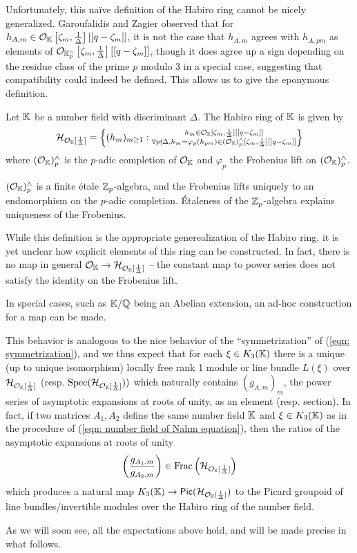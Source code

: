 Unfortunately, this na\"{i}ve definition of the Habiro ring cannot be nicely generalized. Garoufalidis and Zagier observed that for $h_{A,m}\in\mathcal{O}_{\mathbb{K}}\left[\zeta_{m},\frac{1}{\Delta}\right][[q-\zeta_{m}]]$, it is not the case that $h_{A,m}$ agrees with $h_{A,pm}$ as elements of $\mathcal{O}_{\mathbb{K}_{p}^{\wedge}}\left[\zeta_{m},\frac{1}{\Delta}\right][[q-\zeta_{m}]]$, though it does agree up a sign depending on the residue class of the prime $p$ modulo 3 in a special case, suggesting that compatibility could indeed be defined. This allows us to give the eponymous definition. 
\begin{definition}\label{def: Habiro ring of a number field}
    Let $\mathbb{K}$ be a number field with discriminant $\Delta$. The Habiro ring of $\mathbb{K}$ is given by 
    $$\mathcal{H}_{\mathcal{O}_{\mathbb{K}}[\frac{1}{\Delta}]}=\left\{(h_{m})_{m\geq1}:\substack{h_{m}\in\mathcal{O}_{\mathbb{K}}[\zeta_{m},\frac{1}{\Delta}][[q-\zeta_{m}]] \\
    \forall p\nmid\Delta, h_{m}=\varphi_{p}(h_{pm})\in(\mathcal{O}_{\mathbb{K}})_{p}^{\wedge}[\zeta_{m},\frac{1}{\Delta}][[q-\zeta_{m}]]}\right\}$$
    where $(\mathcal{O}_{\mathbb{K}})_{p}^{\wedge}$ is the $p$-adic completion of $\mathcal{O}_{\mathbb{K}}$ and $\varphi_{p}$ the Frobenius lift on $(\mathcal{O}_{\mathbb{K}})_{p}^{\wedge}$. 
\end{definition}
\begin{remark}
    $(\mathcal{O}_{\mathbb{K}})_{p}^{\wedge}$ is a finite \'{e}tale $\mathbb{Z}_{p}$-algebra, and the Frobenius lifts uniquely to an endomorphism on the $p$-adic completion. \'{E}taleness of the $\mathbb{Z}_{p}$-algebra explains uniqueness of the Frobenius.  
\end{remark}
While this definition is the appropriate generealization of the Habiro ring, it is yet unclear how explicit elements of this ring can be constructed. In fact, there is no map in general $\mathcal{O}_{\mathbb{K}}\to\mathcal{H}_{\mathcal{O}_{\mathbb{K}}[\frac{1}{\Delta}]}$ -- the constant map to power series does not satisfy the identity on the Frobenius lift. 
\begin{remark}
    In special cases, such as $\mathbb{K}/\mathbb{Q}$ being an Abelian extension, an ad-hoc construction for a map can be made. 
\end{remark}
This behavior is analogous to the nice behavior of the ``symmetrization'' of (\ref{eqn: symmetrization}), and we thus expect that for each $\xi\in K_{3}(\mathbb{K})$ there is a unique (up to unique isomorphism) locally free rank 1 module or line bundle $L(\xi)$ over $\mathcal{H}_{\mathcal{O}_{\mathbb{K}}[\frac{1}{\Delta}]}$ (resp. $\operatorname{Spec}(\mathcal{H}_{\mathcal{O}_{\mathbb{K}}[\frac{1}{\Delta}]}))$ which naturally contains $(g_{A,m})_{m}$, the power series of asymptotic expansions at roots of unity, as an element (resp. section). In fact, if two matrices $A_{1},A_{2}$ define the same number field $\mathbb{K}$ and $\xi\in K_{3}(\mathbb{K})$ as in the procedure of (\ref{eqn: number field of Nahm equation}), then the ratios of the asymptotic expansions at roots of unity
$$\left(\frac{g_{A_{1},m}}{g_{A_{2},m}}\right)\in\mathrm{Frac}\left(\mathcal{H}_{\mathcal{O}_{\mathbb{K}}[\frac{1}{\Delta}]}\right)$$
which produces a natural map $K_{3}(\mathbb{K})\to\mathsf{Pic}(\mathcal{H}_{\mathcal{O}_{\mathbb{K}}[\frac{1}{\Delta}]})$ to the Picard groupoid of line bundles/invertible modules over the Habiro ring of the number field. 

As we will soon see, all the expectations above hold, and will be made precise in what follows. 